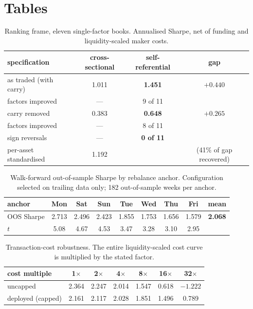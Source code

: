 \documentclass[11pt,letterpaper]{article}
\begin{document}
\newpage
\section*{Tables}

\begin{table}[h]
\centering
\caption{Ranking frame, eleven single-factor books. Annualised Sharpe, net of
funding and liquidity-scaled maker costs.}
\label{tab:frame}
\begin{tabular}{lccc}
\toprule
specification & cross-sectional & self-referential & gap \\
\midrule
as traded (with carry)   & 1.011 & \textbf{1.451} & $+0.440$ \\
\quad factors improved   & ---   & 9 of 11        &          \\
carry removed            & 0.383 & \textbf{0.648} & $+0.265$ \\
\quad factors improved   & ---   & 8 of 11        &          \\
sign reversals           & ---   & \textbf{0 of 11} &        \\
per-asset standardised   & 1.192 & & (41\% of gap recovered) \\
\bottomrule
\end{tabular}
\end{table}

\begin{table}[h]
\centering
\caption{Walk-forward out-of-sample Sharpe by rebalance anchor. Configuration
selected on trailing data only; 182 out-of-sample weeks per anchor.}
\label{tab:anchor}
\begin{tabular}{lccccccc|c}
\toprule
anchor & Mon & Sat & Sun & Tue & Wed & Thu & Fri & mean \\
\midrule
OOS Sharpe & 2.713 & 2.496 & 2.423 & 1.855 & 1.753 & 1.656 & 1.579 & \textbf{2.068} \\
$t$        & 5.08 & 4.67 & 4.53 & 3.47 & 3.28 & 3.10 & 2.95 & \\
\bottomrule
\end{tabular}
\end{table}

\begin{table}[h]
\centering
\caption{Transaction-cost robustness. The entire liquidity-scaled cost curve is
multiplied by the stated factor.}
\label{tab:cost}
\begin{tabular}{lcccccc}
\toprule
cost multiple & 1$\times$ & 2$\times$ & 4$\times$ & 8$\times$ & 16$\times$ & 32$\times$ \\
\midrule
uncapped            & 2.364 & 2.247 & 2.014 & 1.547 & 0.618 & $-1.222$ \\
deployed (capped)   & 2.161 & 2.117 & 2.028 & 1.851 & 1.496 & 0.789 \\
\bottomrule
\end{tabular}
\end{table}
\end{document}
